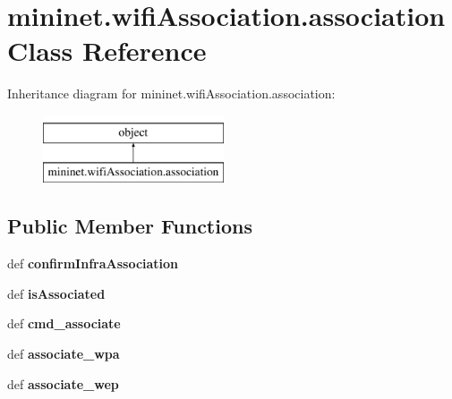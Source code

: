 \hypertarget{classmininet_1_1wifiAssociation_1_1association}{\section{mininet.\-wifi\-Association.\-association Class Reference}
\label{classmininet_1_1wifiAssociation_1_1association}
}
Inheritance diagram for mininet.\-wifi\-Association.\-association\-:\begin{figure}[H]
\begin{center}
\leavevmode
\includegraphics[height=2.000000cm]{classmininet_1_1wifiAssociation_1_1association}
\end{center}
\end{figure}
\subsection*{Public Member Functions}
\begin{DoxyCompactItemize}
\item 
\hypertarget{classmininet_1_1wifiAssociation_1_1association_aabf7b917eff483bde002bb810252ea38}{def {\bfseries confirm\-Infra\-Association}}\label{classmininet_1_1wifiAssociation_1_1association_aabf7b917eff483bde002bb810252ea38}

\item 
\hypertarget{classmininet_1_1wifiAssociation_1_1association_a4b2a30054b859b53ab84c1dad7026422}{def {\bfseries is\-Associated}}\label{classmininet_1_1wifiAssociation_1_1association_a4b2a30054b859b53ab84c1dad7026422}

\item 
\hypertarget{classmininet_1_1wifiAssociation_1_1association_a6e3168ea8c855dbf67cb19bbcad907eb}{def {\bfseries cmd\-\_\-associate}}\label{classmininet_1_1wifiAssociation_1_1association_a6e3168ea8c855dbf67cb19bbcad907eb}

\item 
\hypertarget{classmininet_1_1wifiAssociation_1_1association_a8b09f50615213610818686f9161f4ab4}{def {\bfseries associate\-\_\-wpa}}\label{classmininet_1_1wifiAssociation_1_1association_a8b09f50615213610818686f9161f4ab4}

\item 
\hypertarget{classmininet_1_1wifiAssociation_1_1association_a8099fe98b20c51de150b22b3a58124d0}{def {\bfseries associate\-\_\-wep}}\label{classmininet_1_1wifiAssociation_1_1association_a8099fe98b20c51de150b22b3a58124d0}

\end{DoxyCompactItemize}
